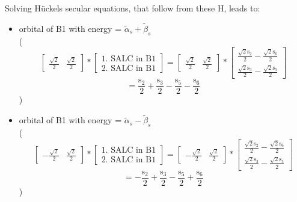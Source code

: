\documentclass[12pt,a4paper]{article}
\begin{document}
Solving Hückels secular equations, that follow from these H, leads to:
\begin{itemize}
\item orbital of B1 with energy = 
                                $\tilde{\alpha}_{s} + \tilde{\beta}_{s}$ \\
( 
$$
\left[\begin{matrix}\frac{\sqrt{2}}{2} & \frac{\sqrt{2}}{2}\end{matrix}\right] * \left[\begin{array}{c}\text{1. SALC in B1} \\ \text{2. SALC in B1}\end{array}\right] = \left[\begin{matrix}\frac{\sqrt{2}}{2} & \frac{\sqrt{2}}{2}\end{matrix}\right] * \left[\begin{matrix}\frac{\sqrt{2} \text{s}_{2}}{2} - \frac{\sqrt{2} \text{s}_{6}}{2}\\\frac{\sqrt{2} \text{s}_{3}}{2} - \frac{\sqrt{2} \text{s}_{5}}{2}\end{matrix}\right] 
 $$ $$ = \frac{\text{s}_{2}}{2} + \frac{\text{s}_{3}}{2} - \frac{\text{s}_{5}}{2} - \frac{\text{s}_{6}}{2} 
 $$ 
 )

\item orbital of B1 with energy = 
                                $\tilde{\alpha}_{s} - \tilde{\beta}_{s}$ \\
( 
$$
\left[\begin{matrix}- \frac{\sqrt{2}}{2} & \frac{\sqrt{2}}{2}\end{matrix}\right] * \left[\begin{array}{c}\text{1. SALC in B1} \\ \text{2. SALC in B1}\end{array}\right] = \left[\begin{matrix}- \frac{\sqrt{2}}{2} & \frac{\sqrt{2}}{2}\end{matrix}\right] * \left[\begin{matrix}\frac{\sqrt{2} \text{s}_{2}}{2} - \frac{\sqrt{2} \text{s}_{6}}{2}\\\frac{\sqrt{2} \text{s}_{3}}{2} - \frac{\sqrt{2} \text{s}_{5}}{2}\end{matrix}\right] 
 $$ $$ = - \frac{\text{s}_{2}}{2} + \frac{\text{s}_{3}}{2} - \frac{\text{s}_{5}}{2} + \frac{\text{s}_{6}}{2} 
 $$ 
 )


\end{itemize}
\end{document}
